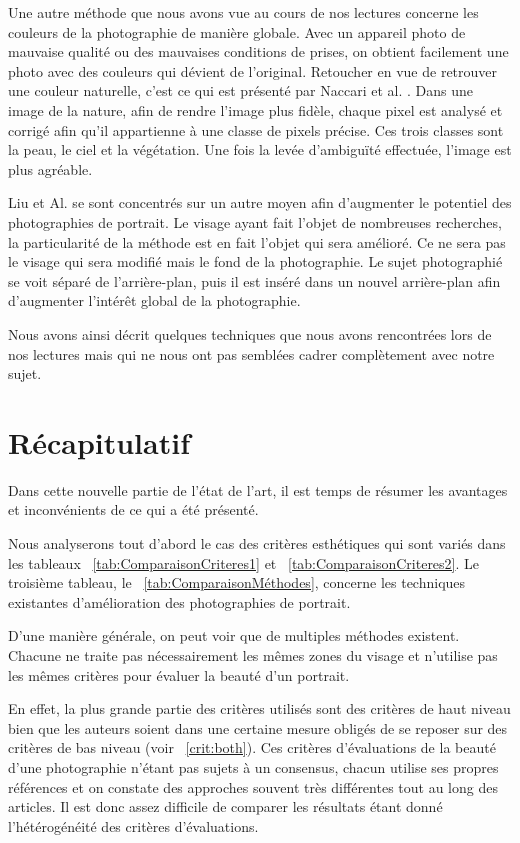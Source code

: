 \documentclass[11pt, french]{report-rd-info}
\begin{document}
Une autre méthode que nous avons vue au cours de nos lectures concerne les couleurs de la photographie de manière globale. Avec un appareil photo de mauvaise qualité ou des mauvaises conditions de prises, on obtient facilement une photo avec des couleurs qui dévient de l’original. Retoucher en vue de retrouver une couleur naturelle, c'est ce qui est présenté par Naccari et al. \cite{Naccari}. Dans une image de la nature, afin de rendre l’image plus fidèle, chaque pixel est analysé et corrigé afin qu’il appartienne à une classe de pixels précise. Ces trois classes sont la peau, le ciel et la végétation. Une fois la levée d’ambiguïté effectuée, l’image est plus agréable.

Liu et Al. \cite{Liu2007} se sont concentrés sur un autre moyen afin d’augmenter le potentiel des photographies de portrait. Le visage ayant fait l’objet de nombreuses recherches, la particularité de la méthode est en fait l’objet qui sera amélioré. Ce ne sera pas le visage qui sera modifié mais le fond de la photographie. Le sujet photographié se voit séparé de l’arrière-plan, puis il est inséré dans un nouvel arrière-plan afin d’augmenter l’intérêt global de la photographie.

Nous avons ainsi décrit quelques techniques que nous avons rencontrées lors de nos lectures mais qui ne nous ont pas semblées cadrer complètement avec notre sujet.
\section{Récapitulatif}
Dans cette nouvelle partie de l'état de l'art, il est temps de résumer les avantages et inconvénients de ce qui a été présenté.

Nous analyserons tout d'abord le cas des critères esthétiques
qui sont variés dans les tableaux ~\ref{tab:ComparaisonCriteres1} et ~\ref{tab:ComparaisonCriteres2}. Le troisième tableau, le ~\ref{tab:ComparaisonMéthodes},
concerne les techniques existantes d'amélioration des photographies de portrait.

D’une manière générale, on peut voir que de multiples méthodes existent. Chacune ne traite pas nécessairement les mêmes zones du visage et n’utilise pas les mêmes critères pour évaluer la beauté d’un portrait.

En effet, la plus grande partie des critères utilisés sont des critères de haut niveau bien que les auteurs soient dans une certaine mesure obligés de se reposer sur des critères de bas niveau (voir ~\ref{crit:both}). Ces critères d’évaluations de la beauté d’une photographie n’étant pas sujets à un consensus, chacun utilise ses propres références et on constate des approches souvent très différentes tout au long des articles. Il est donc assez difficile de comparer les résultats étant donné l’hétérogénéité des critères d’évaluations.
\end{document}
